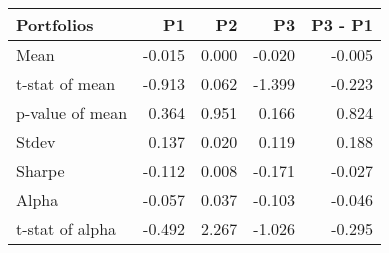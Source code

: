 \begin{tabular}{lrrrr}
\toprule
Portfolios & P1 & P2 & P3 & P3 - P1 \\
\midrule
Mean & -0.015 & 0.000 & -0.020 & -0.005 \\
t-stat of mean & -0.913 & 0.062 & -1.399 & -0.223 \\
p-value of mean & 0.364 & 0.951 & 0.166 & 0.824 \\
Stdev & 0.137 & 0.020 & 0.119 & 0.188 \\
Sharpe & -0.112 & 0.008 & -0.171 & -0.027 \\
Alpha & -0.057 & 0.037 & -0.103 & -0.046 \\
t-stat of alpha & -0.492 & 2.267 & -1.026 & -0.295 \\
\bottomrule
\end{tabular}
